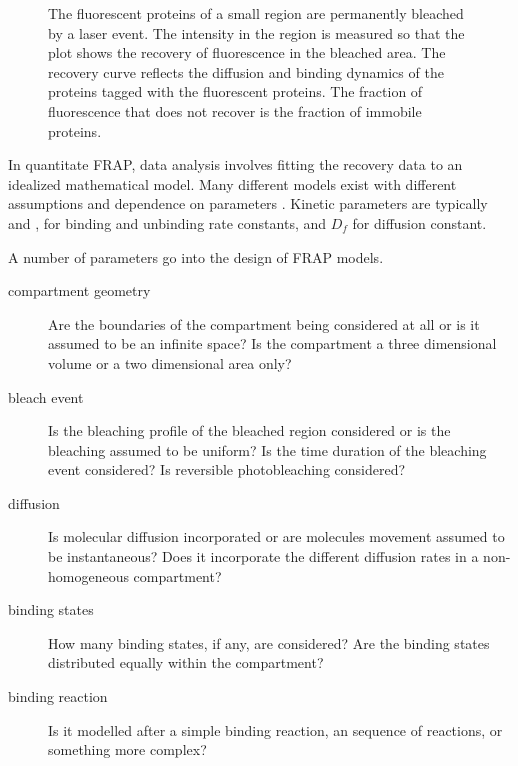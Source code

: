 \begin{figure}

                   {The fluorescent proteins of a small region are
                    permanently bleached by a laser event. The
                    intensity in the region is measured so that the
                    plot shows the recovery of fluorescence in the
                    bleached area.  The recovery curve reflects the
                    diffusion and binding dynamics of the proteins
                    tagged with the fluorescent proteins.  The
                    fraction of fluorescence that does not recover is
                    the fraction of immobile proteins.}
      \label{fig:intro:frap-curve-example}
    \end{figure}

    In quantitate FRAP, data analysis involves fitting the recovery
    data to an idealized mathematical model.
    Many different models exist with different assumptions
    and dependence on
    parameters \citep{mcnally-frap-2010}.
    Kinetic parameters are typically \Kon{} and \Koff{}, for
    binding and unbinding rate constants, and $D_{f}$ for diffusion constant.

    A number of parameters go into the design of FRAP models.
    \begin{description}
    \item[compartment geometry] Are the boundaries of the compartment
      being considered at all or is it assumed to be an infinite space?
      Is the compartment a three dimensional volume or a two
      dimensional area only?
    \item[bleach event] Is the bleaching profile of the bleached
      region considered or is the bleaching assumed to be uniform?  Is
      the time duration of the bleaching event considered?  Is
      reversible photobleaching considered?
    \item[diffusion] Is molecular diffusion incorporated or are
      molecules movement assumed to be instantaneous?  Does it
      incorporate the different diffusion rates in a non-homogeneous
      compartment?
    \item[binding states] How many binding states, if any, are
      considered?  Are the binding states distributed equally within
      the compartment?
    \item[binding reaction] Is it modelled after a simple binding
      reaction, an sequence of reactions, or something more complex?
    \end{description}


